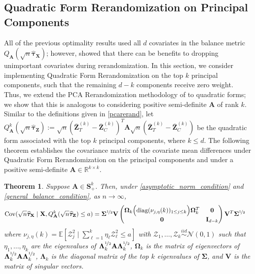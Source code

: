 \documentclass[11pt,twoside]{article}
\newtheorem{theorem}{Theorem}
\theoremstyle{definition}
\theoremstyle{remark}
\begin{document}
\subsection{Quadratic Form Rerandomization on Principal Components} \label{pca_k_section}

All of the previous optimality results used all $d$ covariates in the balance metric $Q_{\mathbf{A}}(\sqrt{n}\widehat{\bm{\tau}}_{\mathbf{X}})$; however, \cite{zhang2023pca} showed that there can be benefits to dropping unimportant covariates during rerandomization. In this section, we consider implementing Quadratic Form Rerandomization on the top $k$ principal components, such that the remaining $d-k$ components receive zero weight. Thus, we extend the PCA Rerandomization methodology of \cite{zhang2023pca} to quadratic forms; we show that this is analogous to considering positive semi-definite $\mathbf{A}$ of rank $k$. Similar to the definitions given in \cref{pcarerand}, let $Q^k_\mathbf{A}(\sqrt{n}\widehat{\bm{\tau}}_{\mathbf{Z}}) := \sqrt{n}(\bar{\mathbf{Z}}^{(k)}_{T} - \bar{\mathbf{Z}}^{(k)}_{C})^T \mathbf{A} \sqrt{n}(\bar{\mathbf{Z}}^{(k)}_{T} - \bar{\mathbf{Z}}^{(k)}_{C})$ be the quadratic form associated with the top $k$ principal components, where $k \leq d$. The following theorem establishes the covariance matrix of the covariate mean differences under Quadratic Form Rerandomization on the principal components and under a positive semi-definite $\mathbf{A} \in \mathbb{R}^{k \times k}$.
\begin{theorem} \label{PCA_QFR}
    Suppose $\mathbf{A} \in \mathbf{S}^{k}_{+}$. Then, under \cref{asymptotic_norm_condition} and \cref{general_balance_condition}, as $n \to \infty$,
    \begin{align*}
        \text{Cov}(\sqrt{n} \widehat{\bm{\tau}}_{\mathbf{X}} \mid \mathbf{X}, Q^k_\mathbf{A}(\sqrt{n} \widehat{\bm{\tau}}_{\mathbf{Z}}) \leq a) &=  \mathbf{\Sigma}^{\nicefrac{1}{2}} \mathbf{V}  \begin{pmatrix}
        \mathbf{\Omega}_k \Big( \text{diag}(\nu_{j, \eta}(k))_{1 \leq j \leq k} \Big) \mathbf{\Omega}^T_k   & \mathbf{0} \\
        \mathbf{0} & \mathbf{I}_{d-k}
    \end{pmatrix} \mathbf{V}^T  \mathbf{\Sigma}^{\nicefrac{1}{2}}  
    \end{align*}
    where $\nu_{j, \eta}(k) = \mathbb{E}\left[\mathcal{Z}^2_j \mid \sum^k_{\ell =1} \eta_\ell \mathcal{Z}^2_\ell \leq a \right]$ with $\mathcal{Z}_1, \ldots, \mathcal{Z}_k \overset{iid}{\sim} \mathcal{N}(0, 1)$ such that $\eta_1, \ldots, \eta_k$ are the eigenvalues of $\mathbf{\Lambda}^{\nicefrac{1}{2}}_k \mathbf{A} \mathbf{\Lambda}^{\nicefrac{1}{2}}_k$, $\mathbf{\Omega}_k$ is the matrix of eigenvectors of $\mathbf{\Lambda}^{\nicefrac{1}{2}}_k \mathbf{A} \mathbf{\Lambda}^{\nicefrac{1}{2}}_k$, $\mathbf{\Lambda}_k$ is the diagonal matrix of the top $k$ eigenvalues of $\mathbf{\Sigma}$, and $\mathbf{V}$ is the matrix of singular vectors.
\end{theorem}
\end{document}
